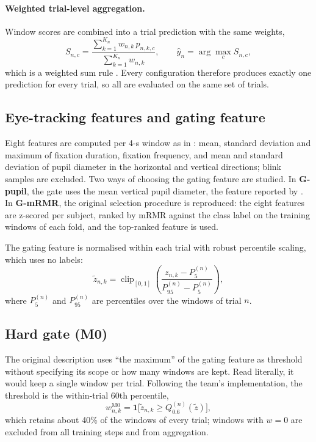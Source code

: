\paragraph{Weighted trial-level aggregation.} Window scores are combined into a trial prediction with the same weights,
\begin{equation}
S_{n,c} = \frac{\sum_{k=1}^{K_n} w_{n,k}\,p_{n,k,c}}{\sum_{k=1}^{K_n} w_{n,k}},\qquad \hat y_n = \arg\max_{c} S_{n,c},
\label{eq:agg}
\end{equation}
which is a weighted sum rule \cite{Kittler1998}. Every configuration therefore produces exactly one prediction for every trial, so all are evaluated on the same set of trials.

\subsection{Eye-tracking features and gating feature}
Eight features are computed per 4-s window as in \cite{FarhadiSedehi2024a}: mean, standard deviation and maximum of fixation duration, fixation frequency, and mean and standard deviation of pupil diameter in the horizontal and vertical directions; blink samples are excluded. Two ways of choosing the gating feature are studied. In \textbf{G-pupil}, the gate uses the mean vertical pupil diameter, the feature reported by \cite{FarhadiSedehi2024a}. In \textbf{G-mRMR}, the original selection procedure is reproduced: the eight features are z-scored per subject, ranked by mRMR against the class label on the training windows of each fold, and the top-ranked feature is used.

The gating feature is normalised within each trial with robust percentile scaling, which uses no labels:
\begin{equation}
\tilde z_{n,k} = \operatorname{clip}_{[0,1]}\left(\frac{z_{n,k}-P_{5}^{(n)}}{P_{95}^{(n)}-P_{5}^{(n)}}\right),
\label{eq:norm}
\end{equation}
where $P_{5}^{(n)}$ and $P_{95}^{(n)}$ are percentiles over the windows of trial $n$.

\subsection{Hard gate (M0)}
The original description uses ``the maximum'' of the gating feature as threshold without specifying its scope or how many windows are kept. Read literally, it would keep a single window per trial. Following the team's implementation, the threshold is the within-trial 60th percentile,
\begin{equation}
w^{\mathrm{M0}}_{n,k} = \mathbf{1}\big[\tilde z_{n,k} \geq Q_{0.6}^{(n)}(\tilde z)\big],
\label{eq:hard}
\end{equation}
which retains about 40\% of the windows of every trial; windows with $w=0$ are excluded from all training steps and from aggregation.

